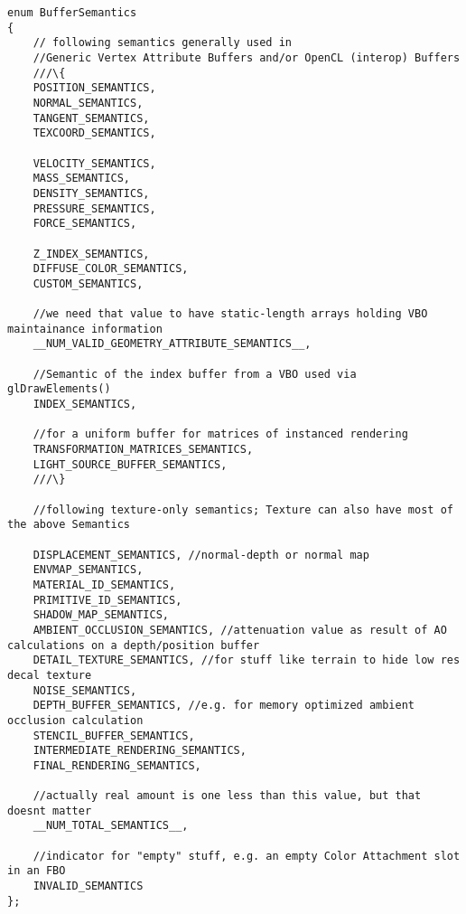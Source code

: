 
\begin{lstlisting}[caption={BufferSemantics},label=listing:BufferSemantics]	
enum BufferSemantics
{
	// following semantics generally used in
	//Generic Vertex Attribute Buffers and/or OpenCL (interop) Buffers
	///\{
	POSITION_SEMANTICS,
	NORMAL_SEMANTICS,
	TANGENT_SEMANTICS,
	TEXCOORD_SEMANTICS,

	VELOCITY_SEMANTICS,
	MASS_SEMANTICS,
	DENSITY_SEMANTICS,
	PRESSURE_SEMANTICS,
	FORCE_SEMANTICS,

	Z_INDEX_SEMANTICS,
	DIFFUSE_COLOR_SEMANTICS,
	CUSTOM_SEMANTICS,

	//we need that value to have static-length arrays holding VBO maintainance information
	__NUM_VALID_GEOMETRY_ATTRIBUTE_SEMANTICS__,

	//Semantic of the index buffer from a VBO used via glDrawElements()
	INDEX_SEMANTICS,

	//for a uniform buffer for matrices of instanced rendering
	TRANSFORMATION_MATRICES_SEMANTICS,
	LIGHT_SOURCE_BUFFER_SEMANTICS,
	///\}

	//following texture-only semantics; Texture can also have most of the above Semantics

	DISPLACEMENT_SEMANTICS, //normal-depth or normal map
	ENVMAP_SEMANTICS,
	MATERIAL_ID_SEMANTICS,
	PRIMITIVE_ID_SEMANTICS,
	SHADOW_MAP_SEMANTICS,
	AMBIENT_OCCLUSION_SEMANTICS, //attenuation value as result of AO calculations on a depth/position buffer
	DETAIL_TEXTURE_SEMANTICS, //for stuff like terrain to hide low res decal texture
	NOISE_SEMANTICS,
	DEPTH_BUFFER_SEMANTICS, //e.g. for memory optimized ambient occlusion calculation
	STENCIL_BUFFER_SEMANTICS,
	INTERMEDIATE_RENDERING_SEMANTICS,
	FINAL_RENDERING_SEMANTICS,

	//actually real amount is one less than this value, but that doesnt matter
	__NUM_TOTAL_SEMANTICS__,

	//indicator for "empty" stuff, e.g. an empty Color Attachment slot in an FBO
	INVALID_SEMANTICS
};
\end{lstlisting}

